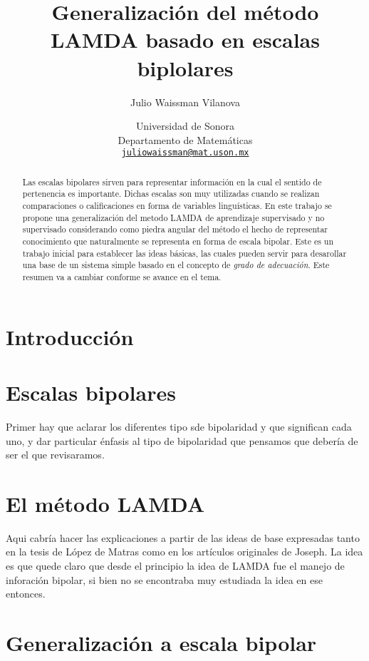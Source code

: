 \documentclass[letterpaper,11pt]{article}
\title{Generalización del método LAMDA basado en escalas biplolares}
\author{Julio Waissman Vilanova}
\date{Universidad de Sonora \\
Departamento de Matemáticas\\
\href{mailto:juliowaissman@mat.uson.mx}{\texttt{juliowaissman@mat.uson.mx}}}
\begin{document}
\maketitle

\begin{abstract}
  Las escalas bipolares sirven para representar información en la cual
  el sentido de pertenencia es importante. Dichas escalas son muy
  utilizadas cuando se realizan comparaciones o calificaciones en
  forma de variables linguísticas. En este trabajo se propone una
  generalización del metodo LAMDA de aprendizaje supervisado y no
  supervisado considerando como piedra angular del método el hecho de
  representar conocimiento que naturalmente se representa en forma de
  escala bipolar. Este es un trabajo inicial para establecer las ideas
  básicas, las cuales pueden servir para desarollar una base de un
  sistema simple basado en el concepto de \emph{grado de
    adecuación}. Este resumen va a cambiar conforme se avance en el
  tema.
 
\end{abstract}

\section{Introducción}
\label{sec:introduccion}

\section{Escalas bipolares}
\label{sec:escalas-bipolares}

Primer hay que aclarar los diferentes tipo sde bipolaridad y que
significan cada uno, y dar particular énfasis al tipo de bipolaridad
que pensamos que debería de ser el que revisaramos.

\section{El método LAMDA}
\label{sec:el-metodo-lamda}

Aqui cabría hacer las explicaciones a partir de las ideas de base
expresadas tanto en la tesis de López de Matras como en los artículos
originales de Joseph. La idea es que quede claro que desde el
principio la idea de LAMDA fue el manejo de inforación bipolar, si
bien no se encontraba muy estudiada la idea en ese entonces.

\section{Generalización a escala bipolar}
\label{sec:gener-escala-bipol}
\end{document}
